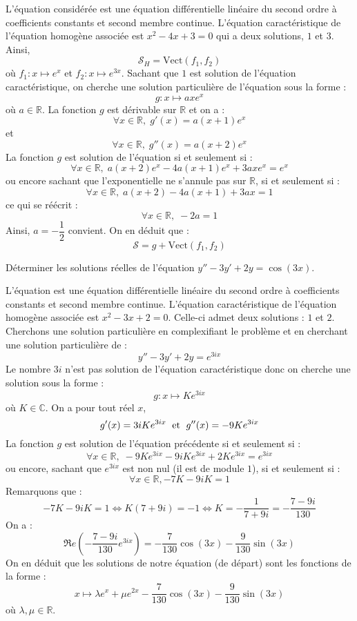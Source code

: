 \documentclass[a4paper,10pt]{report}
\begin{document}
\corr L'équation considérée est une équation différentielle linéaire du second ordre à coefficients constants et second membre continue. L'équation caractéristique de l'équation homogène associée est $x^2-4x+3=0$ qui a deux solutions, $1$ et $3$. Ainsi,
$$ \mathcal{S}_H = \textrm{Vect}(f_1,f_2)$$
où $f_1 : x \mapsto e^x$ et $f_2 : x \mapsto e^{3x}$. Sachant que $1$ est solution de l'équation caractéristique, on cherche une solution particulière de l'équation sous la forme :
$$ g : x \mapsto a x e^x$$
où $a \in \mathbb{R}$. La fonction $g$ est dérivable sur $\mathbb{R}$ et on a :
$$ \forall x \in \mathbb{R}, \; g'(x) = a (x+1)e^x$$
et
$$ \forall x \in \mathbb{R}, \; g''(x) = a (x+2)e^x$$
La fonction $g$ est solution de l'équation si et seulement si :
$$ \forall x \in \mathbb{R}, \;  a (x+2)e^x - 4a (x+1)e^x + 3axe^x = e^x$$
ou encore sachant que l'exponentielle ne s'annule pas sur $\mathbb{R}$, si et seulement si :
$$ \forall x \in \mathbb{R}, \; a (x+2) - 4a (x+1) + 3ax = 1$$
ce qui se réécrit :
$$  \forall x \in \mathbb{R}, \; -2a=1$$
Ainsi, $a= -\dfrac{1}{2}$ convient. On en déduit que :
$$ \mathcal{S} = g +  \textrm{Vect}(f_1,f_2)$$

\begin{Exa} Déterminer les solutions réelles de l'équation $y'' - 3y' + 2y = \cos(3x)$.
\end{Exa}

\corr L'équation est une équation différentielle linéaire du second ordre à coefficients constants et second membre continue. L'équation caractéristique de l'équation homogène associée est $x^2-3x+2=0$. Celle-ci admet deux solutions : $1$ et $2$. Cherchons une solution particulière en \og complexifiant \fg le problème et en cherchant une solution particulière de :
$$  y'' - 3y' + 2y = e^{3ix}$$
Le nombre $3i$ n'est pas solution de l'équation caractéristique donc on cherche une solution sous la forme :
$$ g : x \mapsto K e^{3ix}$$
où $K \in \mathbb{C}$. On a pour tout réel $x$,
$$ g'(x) = 3iK e^{3ix} \; \hbox{ et } \; g''(x) = -9K e^{3ix}$$
La fonction $g$ est solution de l'équation précédente si et seulement si :
$$ \forall x \in \mathbb{R}, \;   -9K e^{3ix} - 9iK e^{3ix} + 2K e^{3ix} = e^{3ix}$$
ou encore, sachant que $e^{3ix}$ est non nul (il est de module $1$), si et seulement si :
$$  \forall x \in \mathbb{R},  -7K - 9iK =1$$
Remarquons que :
$$ -7K - 9iK =1 \Longleftrightarrow K(7+9i) = -1 \Longleftrightarrow K = -\dfrac{1}{7+9i} =     -  \dfrac{7-9i}{130}$$
On a :
$$ \Re e \left(-  \dfrac{7-9i}{130} e^{3ix} \right) = - \dfrac{7}{130} \cos(3x) - \dfrac{9}{130} \sin(3x)$$
On en déduit que les solutions de notre équation (de départ) sont les fonctions de la forme :
$$ x \mapsto \lambda e^{x} + \mu e^{2x} - \dfrac{7}{130} \cos(3x) - \dfrac{9}{130} \sin(3x)$$
où $\lambda, \mu \in \mathbb{R}$.
\end{document}

